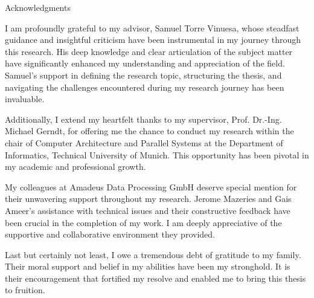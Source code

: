 \thispagestyle{empty}

\vspace*{20mm}

\begin{center}
    { Acknowledgments}
\end{center}

\vspace{10mm}


I am profoundly grateful to my advisor, Samuel Torre Vinuesa, whose steadfast guidance and insightful criticism have been instrumental in my journey through this research. His deep knowledge and clear articulation of the subject matter have significantly enhanced my understanding and appreciation of the field. Samuel's support in defining the research topic, structuring the thesis, and navigating the challenges encountered during my research journey has been invaluable. 

Additionally, I extend my heartfelt thanks to my supervisor, Prof. Dr.-Ing. Michael Gerndt, for offering me the chance to conduct my research within the chair of Computer Architecture and Parallel Systems at the Department of Informatics, Technical University of Munich. This opportunity has been pivotal in my academic and professional growth. 

My colleagues at Amadeus Data Processing GmbH deserve special mention for their unwavering support throughout my research. Jerome Mazeries and Gais Ameer's assistance with technical issues and their constructive feedback have been crucial in the completion of my work. I am deeply appreciative of the supportive and collaborative environment they provided. 

Last but certainly not least, I owe a tremendous debt of gratitude to my family. Their moral support and belief in my abilities have been my stronghold. It is their encouragement that fortified my resolve and enabled me to bring this thesis to fruition. 

\cleardoublepage{}
